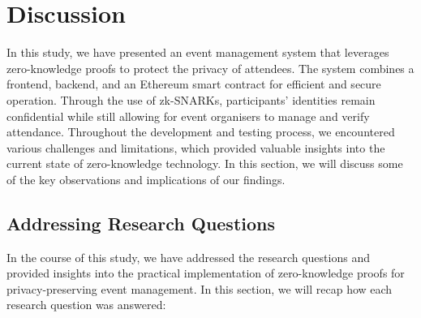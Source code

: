 \chapter{Discussion}
In this study, we have presented an event management system that leverages zero-knowledge proofs to protect the privacy of attendees. The system combines a frontend, backend, and an Ethereum smart contract for efficient and secure operation. Through the use of zk-SNARKs, participants' identities remain confidential while still allowing for event organisers to manage and verify attendance.
Throughout the development and testing process, we encountered various challenges and limitations, which provided valuable insights into the current state of zero-knowledge technology. In this section, we will discuss some of the key observations and implications of our findings.

\section{Addressing Research Questions}
In the course of this study, we have addressed the research questions and provided insights into the practical implementation of zero-knowledge proofs for privacy-preserving event management. In this section, we will recap how each research question was answered:

